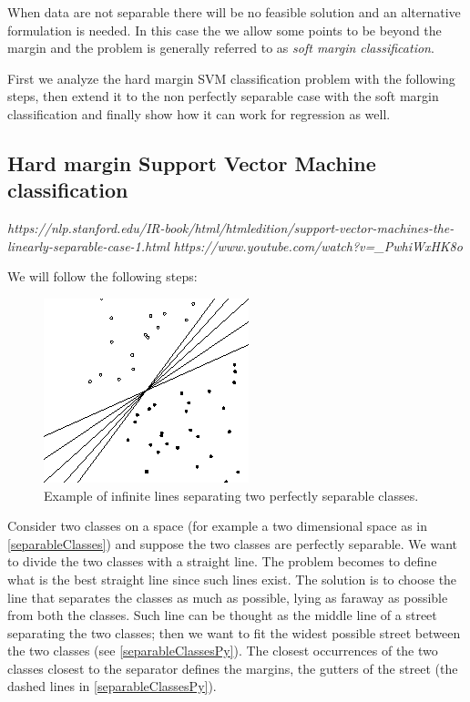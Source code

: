 \documentclass[12pt, letterpaper]{article}
\theoremstyle{definition}
\let\ti\textit
\begin{document}
When data are not separable there will be no feasible solution and an alternative formulation is needed. In this case the we allow some points to be beyond the margin and the problem is generally referred to as \ti{soft margin classification}.

First we analyze the hard margin SVM classification problem with the following steps, then extend it to the non perfectly separable case with the soft margin classification and finally show how it can work for regression as well.

\subsection{Hard margin Support Vector Machine classification}
\label{HardMarginSVM}
\textit{https://nlp.stanford.edu/IR-book/html/htmledition/support-vector-machines-the-linearly-separable-case-1.html}
\textit{https://www.youtube.com/watch?v=\_PwhiWxHK8o}

We will follow the following steps:

\begin{figure}
\centering
\includegraphics[scale=0.6]{img/separableClasses}
\caption{Example of infinite lines separating two perfectly separable classes.}
\label{separableClasses}
\end{figure}

Consider two classes on a space (for example a two dimensional space as in \autoref{separableClasses}) and suppose the two classes are perfectly separable. We want to divide the two classes with a straight line. The problem becomes to define what is the best straight line since such lines exist. The solution is to choose the line that separates the classes as much as possible, lying as faraway as possible from both the classes. Such line can be thought as the middle line of a street separating the two classes; then we want to fit the widest possible street between the two classes (see \autoref{separableClassesPy}). The closest occurrences of the two classes closest to the separator defines the margins, the gutters of the street (the dashed lines in \autoref{separableClassesPy}).
\end{document}
